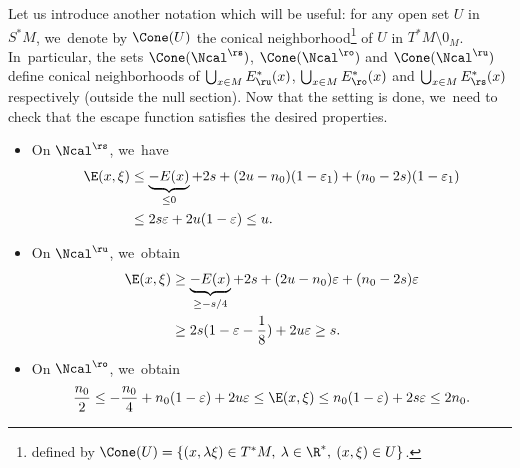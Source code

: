 Let us introduce another notation which will be useful: for any open set $U$ in $S^*M$, we~denote by $\Cone(U)$ the conical neighborhood\footnote{defined by $\Cone(U) = \left\{ (x,\lambda \xi) \in T^* M, \: \lambda \in \R^*, \: (x,\xi) \in U \right\}$.} of $U$ in $T^*M \setminus 0_M$. In~particular, the sets $\Cone(\Ncal^\rs)$, $\Cone(\Ncal^\ro)$ and $\Cone(\Ncal^\ru)$ define conical neighborhoods of $\bigcup_{x \in M} E_\ru^* (x)$, $\bigcup_{x \in M} E_\ro^* (x)$ and $\bigcup_{x \in M} E_\rs^* (x)$ respectively (outside the null section). Now that the setting is done, we~need to check that the escape function satisfies the desired properties.
\begin{itemize}
\item On $\Ncal^\rs$, we~have
\begin{align*}
\E(x,\xi) &\leq \underbrace{-E (x)}_{\leq 0} + 2s + (2u - n_0) (1 - \varepsilon_1) + (n_0 - 2s) (1 - \varepsilon_1) \\
&\leq 2s \varepsilon + 2u (1 - \varepsilon) \leq u.
\end{align*}
\item On $\Ncal^\ru$, we~obtain
\begin{align*}
\E(x,\xi) &\geq \underbrace{-E (x)}_{\geq - s/4} + 2s + (2u - n_0) \varepsilon + (n_0 - 2s) \varepsilon \\
&\geq 2s (1 - \varepsilon - \frac{1}{8}) + 2u \varepsilon \geq s.
\end{align*}
\item On $\Ncal^\ro$, we~obtain
\begin{align*}
\frac{n_0}{2} \leq - \frac{n_0}{4} + n_0 (1 - \varepsilon) + 2u \varepsilon \leq \E(x,\xi) \leq n_0 (1 - \varepsilon) + 2s \varepsilon \leq 2n_0.
\end{align*}
\end{itemize}

